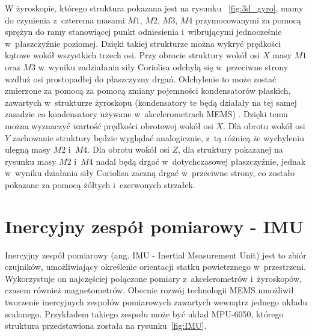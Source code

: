 \documentclass[11pt, twoside]{Thesis} %
\begin{document}
W żyroskopie, którego struktura pokazana jest na rysunku ~\ref{fig:3d_gyro}, mamy do czynienia z~czterema masami $M1$, $M2$, $M3$, $M4$ przymocowanymi za pomocą sprężyn do ramy stanowiącej punkt odniesienia i~wibrującymi jednocześnie w~płaszczyźnie poziomej. Dzięki takiej strukturze można wykryć prędkości kątowe wokół wszystkich trzech osi. Przy obrocie struktury wokół osi $X$ masy $M1$ oraz $M3$ w~wyniku zadziałania siły Coriolisa odchylą się w~przeciwne strony wzdłuż osi prostopadłej do płaszczyzny drgań. Odchylenie to może zostać zmierzone za pomocą za pomocą zmiany pojemności kondensatorów płaskich, zawartych w~strukturze żyroskopu (kondensatory te będą działały na tej samej zasadzie co kondensatory używane w~akcelerometrach MEMS) . Dzięki temu można wyznaczyć wartość prędkości obrotowej wokół osi $X$. Dla obrotu wokół osi $Y$ zachowanie struktury będzie wyglądać analogicznie, z~tą różnicą że wychyleniu ulegną masy $M2$ i~$M4$. Dla obrotu wokół osi $Z$, dla struktury pokazanej na rysunku masy $M2$ i~$M4$ nadal będą drgać w~dotychczasowej płaszczyźnie, jednak w~wyniku działania siły Coriolisa zaczną drgać w~przeciwne strony, co zostało pokazane za pomocą żółtych i~czerwonych strzałek.



\section{Inercyjny zespół pomiarowy - IMU}

Inercyjny zespół pomiarowy (ang. IMU - Inertial Measurement Unit) jest to zbiór czujników, umożliwiający określenie orientacji statku powietrznego w~przestrzeni. Wykorzystuje on najczęściej połączone pomiary z~akcelerometrów i~żyroskopów, czasem również magnetometrów. Obecnie rozwój technologii MEMS umożliwił tworzenie inercyjnych zespołów pomiarowych zawartych wewnątrz jednego układu scalonego. Przykładem takiego zespołu może być układ MPU-6050, którego struktura przedstawiona została na rysunku~\ref{fig:IMU}.
\end{document}
